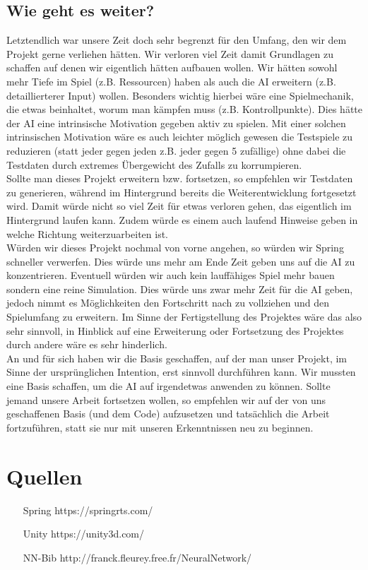 \documentclass[
	12pt,
	a4paper,
	BCOR10mm,
	DIV14,
	headsepline,
	usegeometry,
]{scrreprt}
\begin{document}
\section{Wie geht es weiter?}
Letztendlich war unsere Zeit doch sehr begrenzt für den Umfang, den wir dem Projekt gerne verliehen hätten. Wir verloren viel Zeit damit Grundlagen zu schaffen auf denen wir eigentlich hätten aufbauen wollen. Wir hätten sowohl mehr Tiefe im Spiel (z.B. Ressourcen) haben als auch die AI erweitern (z.B. detaillierterer Input) wollen. Besonders wichtig hierbei wäre eine Spielmechanik, die etwas beinhaltet, worum man kämpfen muss (z.B. Kontrollpunkte). Dies hätte der AI eine intrinsische Motivation gegeben aktiv zu spielen. Mit einer solchen intrinsischen Motivation wäre es auch leichter möglich gewesen die Testspiele zu reduzieren (statt jeder gegen jeden z.B. jeder gegen 5 zufällige) ohne dabei die Testdaten durch extremes Übergewicht des Zufalls zu korrumpieren.\\
Sollte man dieses Projekt erweitern bzw. fortsetzen, so empfehlen wir Testdaten zu generieren, während im Hintergrund bereits die Weiterentwicklung fortgesetzt wird. Damit würde nicht so viel Zeit für etwas verloren gehen, das eigentlich im Hintergrund laufen kann. Zudem würde es einem auch laufend Hinweise geben in welche Richtung weiterzuarbeiten ist.\\
Würden wir dieses Projekt nochmal von vorne angehen, so würden wir Spring schneller verwerfen. Dies würde uns mehr am Ende Zeit geben uns auf die AI zu konzentrieren. Eventuell würden wir auch kein lauffähiges Spiel mehr bauen sondern eine reine Simulation. Dies würde uns zwar mehr Zeit für die AI geben, jedoch nimmt es Möglichkeiten den Fortschritt nach zu vollziehen und den Spielumfang zu erweitern. Im Sinne der Fertigstellung des Projektes wäre das also sehr sinnvoll, in Hinblick auf eine Erweiterung oder Fortsetzung des Projektes durch andere wäre es sehr hinderlich.\\
An und für sich haben wir die Basis geschaffen, auf der man unser Projekt, im Sinne der ursprünglichen Intention, erst sinnvoll durchführen kann. Wir mussten eine Basis schaffen, um die AI auf irgendetwas anwenden zu können. Sollte jemand unsere Arbeit fortsetzen wollen, so empfehlen wir auf der von uns geschaffenen Basis (und dem Code) aufzusetzen und tatsächlich die Arbeit fortzuführen, statt sie nur mit unseren Erkenntnissen neu zu beginnen.





\appendix
\appendixpage

\chapter{Quellen}

\begin{itemize}
	\item[Spring] https://springrts.com/
	\item[Unity] https://unity3d.com/
	\item[NN-Bib] http://franck.fleurey.free.fr/NeuralNetwork/
\end{itemize}

\listoffigures
\end{document}
